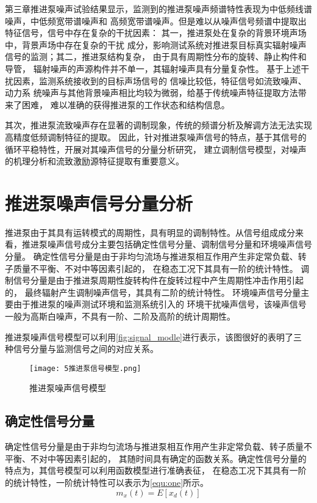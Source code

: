 第三章推进泵噪声试验结果显示，监测到的推进泵噪声频谱特性表现为中低频线谱噪声，中低频宽带谱噪声和
高频宽带谱噪声。但是难以从噪声信号频谱中提取出特征信号，信号中存在复杂的干扰因素：
其一，推进泵处在复杂的背景环境声场中，背景声场中存在复杂的干扰
成分，影响测试系统对推进泵目标真实辐射噪声信号的监测；其二，推进泵结构复杂，
由于具有周期性分布的旋转、静止构件和导管，
辐射噪声的声源构件并不单一，其辐射噪声具有分量复杂性。
基于上述干扰因素，监测系统接收到的目标声场信号的
信噪比较低，特征信号如流致噪声、动力系
统噪声与其他背景噪声相比均较为微弱，给基于传统噪声特征提取方法带来了困难，
难以准确的获得推进泵的工作状态和结构信息。

其次，推进泵流致噪声存在显著的调制现象，传统的频谱分析及解调方法无法实现高精度低频调制特征的提取。
因此，针对推进泵噪声信号的特点，基于其信号的循环平稳特性，开展对其噪声信号的分量分析研究，
建立调制信号模型，对噪声的机理分析和流致激励源特征提取有重要意义。
\section{推进泵噪声信号分量分析}
推进泵由于其具有运转模式的周期性，具有明显的调制特性。从信号组成成分来看，推进泵噪声信号成分主要包括确定性信号分量、调制信号分量和环境噪声信号分量。
确定性信号分量是由于非均匀流场与推进泵相互作用产生非定常负载、转子质量不平衡、不对中等因素引起的，
在稳态工况下其具有一阶的统计特性。
调制信号分量是由于推进泵周期性旋转构件在旋转过程中产生周期性冲击作用引起的，
最终辐射产生调制噪声信号，其具有二阶的统计特性。
环境噪声信号分量主要由于推进泵的噪声测试环境和监测系统引入的
环境干扰噪声信号，该噪声信号一般为高斯白噪声，不具有一阶、二阶及高阶的统计周期性。

推进泵噪声信号模型可以利用\autoref{fig:signal_modle}进行表示，该图很好的表明了三
种信号分量与监测信号之间的对应关系。
\begin{figure}[htbp]
    \centering
    \texttt{[image: 5推进泵信号模型.png]}
    \caption{\label{fig:signal_modle}推进泵噪声信号模型}
\end{figure}

\subsection{确定性信号分量}
确定性信号分量是由于非均匀流场与推进泵相互作用产生非定常负载、转子质量不平衡、不对中等因素引起的，
其随时间具有确定的函数关系。确定性信号分量的特点为，其信号模型可以利用函数模型进行准确表征，
在稳态工况下其具有一阶的统计特性，一阶统计特性可以表示为\autoref{equ:one}所示。
\begin{equation}
    \label{equ:one}
    m_{x}\left ( t \right ) =E\left [ x_{d}\left ( t   \right )  \right ]
\end{equation}

